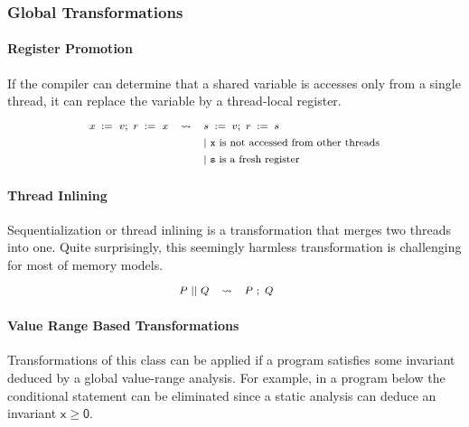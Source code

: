 \subsubsection{Global Transformations}

\paragraph{Register Promotion}

If the compiler can determine that a shared variable 
is accesses only from a single thread, it can replace 
the variable by a thread-local register. 
%
\[\def\arraystretch{1.4}\footnotesize
  \begin{array}{ccl} 

      \writeInst{}{x}{v} \seq \readInst{}{r}{x} 
    & \leadsto 
    & \assignInst{s}{v} \seq \assignInst{r}{s}
    \\ 
    
    & & |~ \text{\texttt{x} is not accessed from other threads} \\
    & & |~ \text{\texttt{s} is a fresh register} \\ 

  \end{array}
\]

\paragraph{Thread Inlining}

Sequentialization or thread inlining 
is a transformation that merges two threads into one.
Quite surprisingly, this seemingly harmless transformation
is challenging for most of memory models. 
%
\[\def\arraystretch{1.4}\footnotesize
  \begin{array}{cccl} 

      P \pll Q 
    & \leadsto 
    & P ~\seq Q
    & ~ \\ 
    
  \end{array}
\]


\paragraph{Value Range Based Transformations}

Transformations of this class can be applied 
if a program satisfies some invariant deduced 
by a global value-range analysis. 
For example, in a program below   
the conditional statement can be eliminated 
since a static analysis can deduce an invariant 
$\mathsf{x} \geq \mathsf{0}$.

